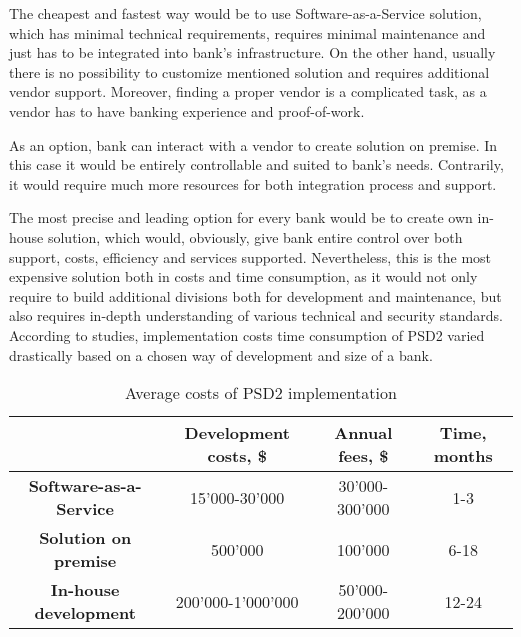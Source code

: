 The cheapest and fastest way would be to use Software-as-a-Service solution, which has minimal technical requirements, requires minimal maintenance and just has to be integrated into bank's infrastructure. 
On the other hand, usually there is no possibility to customize mentioned solution and requires additional vendor support. 
Moreover, finding a proper vendor is a complicated task, as a vendor has to have banking experience and proof-of-work.

As an option, bank can interact with a vendor to create solution on premise. 
In this case it would be entirely controllable and suited to bank's needs. 
Contrarily, it would require much more resources for both integration process and support.

The most precise and leading option for every bank would be to create own in-house solution, which would, obviously, give bank entire control over both support, costs, efficiency and services supported.
Nevertheless, this is the most expensive solution both in costs and time consumption, as it would not only require to build additional divisions both for development and maintenance, but also requires in-depth understanding of various technical and security standards.
According to studies, implementation costs time consumption of PSD2 varied drastically based on a chosen way of development and size of a bank. 
\cite{saltedge_open_banking_report}
\cite{deloitte_psd2_costs}

\begin{table}
    \centering
    \caption{Average costs of PSD2 implementation}
    \begin{tabular}{| c | c | c | c |}
        \hline
        &
        \textbf{Development costs, \$} & 
        \textbf{Annual fees, \$} &
        \textbf{Time, months} \\ \hline 
       
        \textbf{Software-as-a-Service} & 
            15'000-30'000 & 
            30'000-300'000 &
            1-3 \\ \hline 
       
        \textbf{Solution on premise} & 
            500'000 &
            100'000 &
            6-18 \\ \hline 

        \textbf{In-house development} &
            200'000-1'000'000 &
            50'000-200'000 &
            12-24 \\ \hline
    \end{tabular}
    \medskip
\end{table}

